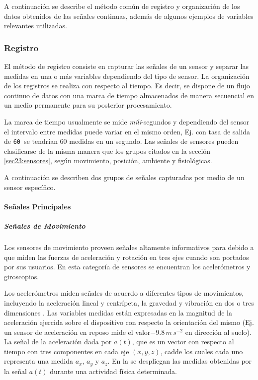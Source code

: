 A continuación se describe el método común de registro y organización
de los datos obtenidos de las señales continuas, además de algunos
ejemplos de variables relevantes utilizadas.

\subsubsection{Registro}

El método de registro consiste en capturar las señales de un sensor
y separar las medidas en una o más variables dependiendo del tipo
de sensor. La organización de los registros se realiza con respecto
al tiempo. Es decir, se dispone de un flujo continuo de datos con
una marca de tiempo almacenados de manera secuencial en un medio permanente
para su posterior procesamiento. 

La marca de tiempo usualmente se mide \emph{mili}-segundos y dependiendo
del sensor el intervalo entre medidas puede variar en el mismo orden,
Ej. con tasa de salida de \texttt{60  }se tendrían 60 medidas
en un segundo. Las señales de sensores pueden clasificarse de la misma
manera que los grupos citados en la sección \ref{sec23:sensores},
según movimiento, posición, ambiente y fisiológicas. 

A continuación se describen dos grupos de señales capturadas por medio
de un sensor específico.

\paragraph{Señales Principales}

\subparagraph{Señales de Movimiento}

Los sensores de movimiento proveen señales altamente informativos
para  debido a que miden las fuerzas de aceleración y rotación
en tres ejes cuando son portados por sus usuarios. En esta categoría
de sensores se encuentran los acelerómetros y giroscopios. 

Los acelerómetros miden señales de acuerdo a diferentes tipos de movimientos,
incluyendo la aceleración lineal y centrípeta, la gravedad y vibración
en dos o tres dimensiones \cite{Goehl2007}. Las variables medidas
están expresadas en la magnitud de la aceleración ejercida sobre el
dispositivo con respecto la orientación del mismo (Ej. un sensor de
aceleración en reposo mide el valor$-9.8\,m\,s^{-2}$ en dirección
al suelo). La señal de la aceleración dada por $a(t)$, que es un
vector con respecto al tiempo con tres componentes en cada eje $(x,y,z)$,
cadde los cuales cada uno representa una medida $a_{x}$, $a_{y}$
y $a_{z}$. En la  se despliegan las medidas
obtenidas por la señal $a(t)$ durante una actividad física determinada.

